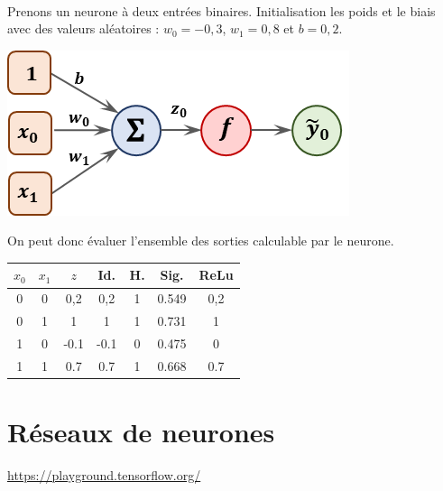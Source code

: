 \begin{exemple}~\\



\begin{minipage}[c]{.4\linewidth}

Prenons un neurone à deux entrées binaires. 
Initialisation les poids et le biais avec des valeurs aléatoires : $w_0 = -0,3$, $w_1 = 0,8$ et $b=0,2$.

\begin{center}
\includegraphics[width=.9\linewidth]{images/fig_02}
\end{center}
\hfill
\end{minipage}
\begin{minipage}[c]{.55\linewidth}


On peut donc évaluer l'ensemble des sorties calculable par le neurone.

\begin{center}
\begin{tabular}{|c|c|| c || c| c|c|c|}
\hline
$x_0$ & $x_1$ & $z$ & Id. & H. & Sig. & ReLu \\
\hline
\hline
0 & 0 & 0,2   &   0,2   &  1 & 0.549 & 0,2 \\
0 & 1 & 1     &    1     &  1 & 0.731  & 1\\
1 & 0 & -0.1  &    -0.1 &  0 &0.475 & 0 \\
1 & 1 & 0.7  &     0.7  &  1 &0.668 & 0.7\\
\hline
\end{tabular}
\end{center}
\end{minipage}

\end{exemple}


\section{Réseaux de neurones}
\url{https://playground.tensorflow.org/}


